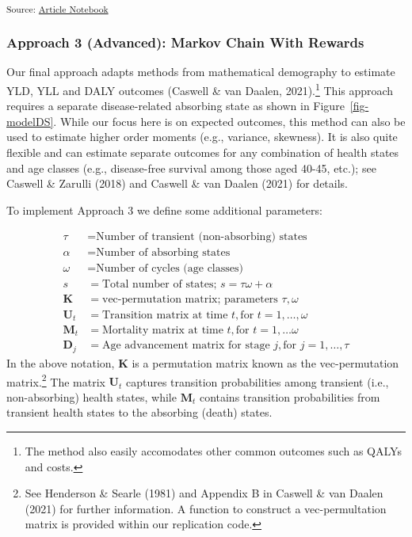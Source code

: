 \documentclass[
]{agujournal2019}
\begin{document}
\textsubscript{Source:
\href{https://graveja0.github.io/dalys/index.qmd.html}{Article
Notebook}}

\subsubsection{Approach 3 (Advanced): Markov Chain With
Rewards}\label{approach-3-advanced-markov-chain-with-rewards}

Our final approach adapts methods from mathematical demography to
estimate YLD, YLL and DALY outcomes (Caswell \& van Daalen,
2021).\footnote{The method also easily accomodates other common outcomes
  such as QALYs and costs.} This approach requires a separate
disease-related absorbing state as shown in Figure~\ref{fig-modelDS}.
While our focus here is on expected outcomes, this method can also be
used to estimate higher order moments (e.g., variance, skewness). It is
also quite flexible and can estimate separate outcomes for any
combination of health states and age classes (e.g., disease-free
survival among those aged 40-45, etc.); see Caswell \& Zarulli (2018)
and Caswell \& van Daalen (2021) for details.

To implement Approach 3 we define some additional parameters:

\[
\begin{aligned}
\tau &= \text{Number of transient (non-absorbing) states}\\
\alpha &= \text{Number of absorbing states}\\
\omega &= \text{Number of cycles (age classes)} \\
s &= \text{Total number of states; }s=\tau\omega+\alpha \\
\mathbf{K} &= \text{vec-permutation matrix; parameters }\tau,\omega\\
\mathbf{U}_{t} &= \text{Transition matrix at time }t, \text{for }t=1,\dots,\omega\\
\mathbf{M}_{t} &= \text{Mortality matrix at time  }t, \text{for } t = 1,\dots\omega \\
\mathbf{D}_{j} &=\text{Age advancement matrix for stage }j, \text{for }j=1,\dots,\tau 
\end{aligned}
\] In the above notation, \(\mathbf{K}\) is a permutation matrix known
as the vec-permutation matrix.\footnote{See Henderson \& Searle (1981)
  and Appendix B in Caswell \& van Daalen (2021) for further
  information. A function to construct a vec-permultation matrix is
  provided within our replication code.} The matrix \(\mathbf{U}_t\)
captures transition probabilities among transient (i.e., non-absorbing)
health states, while \(\mathbf{M}_t\) contains transition probabilities
from transient health states to the absorbing (death) states.
\end{document}
